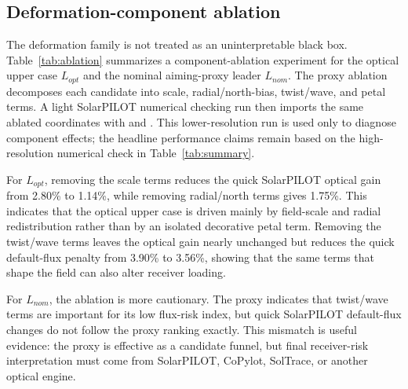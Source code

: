 \documentclass[final,3p,times]{elsarticle}
\begin{document}
\subsection{Deformation-component ablation}
The deformation family is not treated as an uninterpretable black box. Table~\ref{tab:ablation} summarizes a component-ablation experiment for the optical upper case $L_{opt}$ and the nominal aiming-proxy leader $L_{nom}$. The proxy ablation decomposes each candidate into scale, radial/north-bias, twist/wave, and petal terms. A light SolarPILOT numerical checking run then imports the same ablated coordinates with  and . This lower-resolution run is used only to diagnose component effects; the headline performance claims remain based on the high-resolution numerical check in Table~\ref{tab:summary}.

For $L_{opt}$, removing the scale terms reduces the quick SolarPILOT optical gain from 2.80\% to 1.14\%, while removing radial/north terms gives 1.75\%. This indicates that the optical upper case is driven mainly by field-scale and radial redistribution rather than by an isolated decorative petal term. Removing the twist/wave terms leaves the optical gain nearly unchanged but reduces the quick default-flux penalty from 3.90\% to 3.56\%, showing that the same terms that shape the field can also alter receiver loading.

For $L_{nom}$, the ablation is more cautionary. The proxy indicates that twist/wave terms are important for its low flux-risk index, but quick SolarPILOT default-flux changes do not follow the proxy ranking exactly. This mismatch is useful evidence: the proxy is effective as a candidate funnel, but final receiver-risk interpretation must come from SolarPILOT, CoPylot, SolTrace, or another optical engine.
\end{document}
